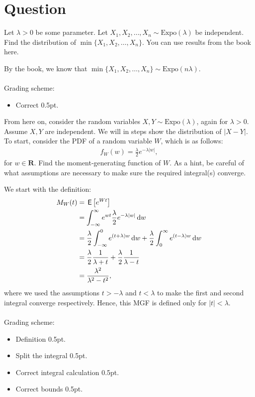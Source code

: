 \section{Question}

\begin{exercise}[0.5]
Let $\lambda>0$ be some parameter. Let $X_1,X_2,\dots,X_n \sim\text{Expo}(\lambda)$ be independent. Find the distribution of $\min{\{X_1,X_2,\dots,X_n\}}$. You can use results from the book here.
\begin{solution}
By the book, we know that $\min{\{X_1,X_2,\dots,X_n\}}\sim\text{Expo}(n\lambda)$.
\\\\
Grading scheme:
\begin{itemize}
    \item Correct 0.5pt.
\end{itemize}
\end{solution}
\end{exercise}

\begin{exercise}[2]
From here on, consider the random variables $X,Y\sim\text{Expo}(\lambda)$, again for $\lambda>0$. Assume $X,Y$ are independent. We will in steps show the distribution of $\left|X-Y\right|$.\\ To start, consider the PDF of a random variable $W$, which is as follows:
\begin{align*}
    f_W(w) = \frac{\lambda}{2}e^{-\lambda\left|w\right|},
\end{align*}
for $w\in\mathbf{R}$. Find the moment-generating function of $W$. As a hint, be careful of what assumptions are necessary to make sure the required integral(s) converge.
\begin{solution}
We start with the definition:
\begin{align*}
    M_W(t) &= \E{e^{W t}}\\%
    &= \int_{-\infty}^\infty{e^{w t}\frac{\lambda}{2}e^{-\lambda\left|w\right|}\d w}\\
    &= \frac{\lambda}{2}\int_{-\infty}^0{e^{(t+\lambda) w}\d w} + \frac{\lambda}{2}\int_{0}^\infty{e^{(t-\lambda) w}\d w}\\
    &= \frac{\lambda}{2}\frac{1}{\lambda+t}+\frac{\lambda}{2}\frac{1}{\lambda-t}\\
    &= \frac{\lambda^2}{\lambda^2-t^2},
\end{align*}
where we used the assumptions $t>-\lambda$ and $t<\lambda$ to make the first and second integral converge respectively. Hence, this MGF is defined only for $\left|t\right|<\lambda$.
\\\\
Grading scheme:
\begin{itemize}
    \item Definition 0.5pt.
    \item Split the integral 0.5pt.
    \item Correct integral calculation 0.5pt.
    \item Correct bounds 0.5pt.
\end{itemize}
\end{solution}
\end{exercise}

